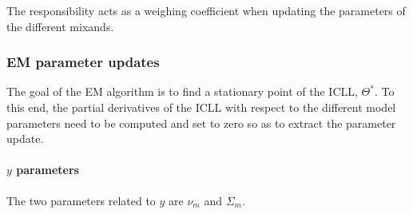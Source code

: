 The responsibility acts as a weighing coefficient when updating the parameters of the different mixands. 
\subsubsection{EM parameter updates}
The goal of the EM algorithm is to find a stationary point of the ICLL, $\Theta^*$. To this end, the partial derivatives of the ICLL with respect to the different model parameters need to be computed and set to zero so as to extract the parameter update.

\paragraph{$y$ parameters}
The two parameters related to $y$ are $\nu_m$ and $\Sigma_m$.

